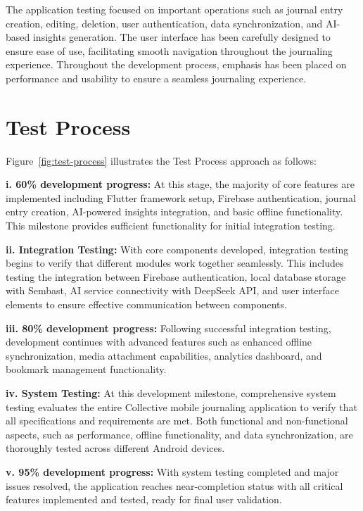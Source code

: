 The application testing focused on important operations such as journal entry creation, editing, deletion, user authentication, data synchronization, and AI-based insights generation. The user interface has been carefully designed to ensure ease of use, facilitating smooth navigation throughout the journaling experience. Throughout the development process, emphasis has been placed on performance and usability to ensure a seamless journaling experience.

\section{Test Process}\label{sec:testProcess}

Figure~\ref{fig:test-process} illustrates the Test Process approach as follows:

\textbf{i. 60\% development progress:} At this stage, the majority of core features are implemented including Flutter framework setup, Firebase authentication, journal entry creation, AI-powered insights integration, and basic offline functionality. This milestone provides sufficient functionality for initial integration testing.

\textbf{ii. Integration Testing:} With core components developed, integration testing begins to verify that different modules work together seamlessly. This includes testing the integration between Firebase authentication, local database storage with Sembast, AI service connectivity with DeepSeek API, and user interface elements to ensure effective communication between components.

\textbf{iii. 80\% development progress:} Following successful integration testing, development continues with advanced features such as enhanced offline synchronization, media attachment capabilities, analytics dashboard, and bookmark management functionality.

\textbf{iv. System Testing:} At this development milestone, comprehensive system testing evaluates the entire Collective mobile journaling application to verify that all specifications and requirements are met. Both functional and non-functional aspects, such as performance, offline functionality, and data synchronization, are thoroughly tested across different Android devices.

\textbf{v. 95\% development progress:} With system testing completed and major issues resolved, the application reaches near-completion status with all critical features implemented and tested, ready for final user validation.

